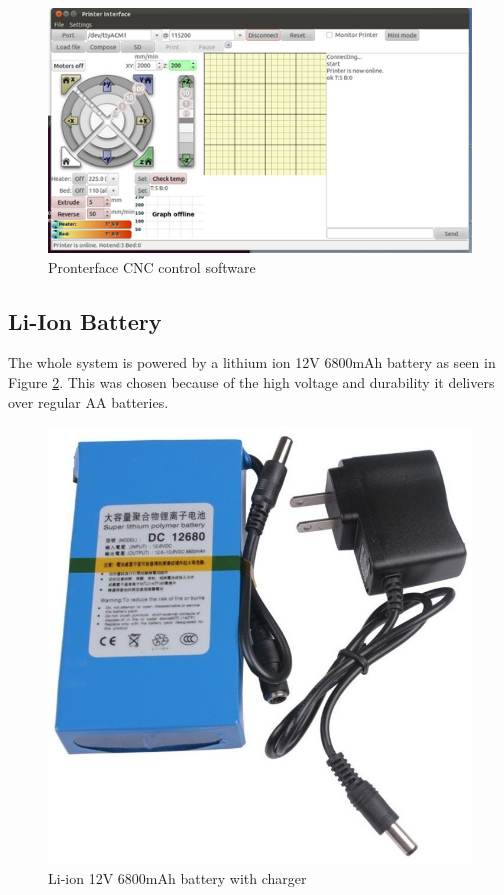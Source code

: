 			\begin{figure}[H]
					\centering
					\includegraphics[scale=1.4]{images/ProjectComponents/pronterface.png}
					\caption{Pronterface CNC control software}
					\label{battery}
			\end{figure}
			\bigskip






\subsection{Li-Ion Battery}

	The whole system is powered by a lithium ion 12V 6800mAh battery as seen in Figure \ref{battery}. This was chosen because of the high voltage and durability it delivers over regular AA batteries.

		\begin{figure}[H]
				\centering
				\includegraphics[scale=0.25]{images/ProjectComponents/battery.jpg}
				\caption{Li-ion 12V 6800mAh battery with charger}
				\label{battery}
		\end{figure}
		\bigskip

